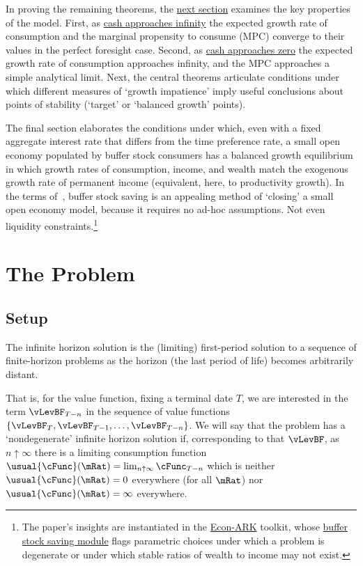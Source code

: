 \documentclass[BufferStockTheory]{subfiles}
\begin{document}
 In proving the remaining theorems, the \hyperlink{AnalysisoftheConvergedConsumptionFunction}{next section} examines the key properties of the model. First, as \hyperlink{LimitsAsmtToInfty}{cash approaches infinity} the expected growth rate of consumption and the marginal propensity to consume (MPC) converge to their values in the perfect foresight case. Second, as \hyperlink{LimitsAsmtToZero}{cash approaches zero} the expected growth rate of consumption approaches infinity, and the MPC approaches a simple analytical limit.  Next, the central theorems articulate conditions under which different measures of `growth impatience' imply useful conclusions about points of stability (`target' or `balanced growth' points).

The final section elaborates the conditions under which, even with a fixed aggregate interest rate that differs from the time preference rate, a small open economy populated by buffer stock consumers has a balanced growth equilibrium in which growth rates of consumption, income, and wealth match the exogenous growth rate of permanent income (equivalent, here, to productivity growth). In the terms of~\cite{schmitt2003closing}, buffer stock saving is an appealing method of `closing' a small open economy model, because it requires no ad-hoc assumptions.  Not even liquidity constraints.\footnote{The paper's insights are instantiated in the \href{https://econ-ark.org}{Econ-ARK} toolkit, whose \href{https://hark.readthedocs.io/en/stable/reference/ConsumptionSaving/ConsIndShockModel.html}{buffer stock saving module} flags parametric choices under which a problem is degenerate or under which stable ratios of wealth to income may not exist.}


\hypertarget{The-Problem}{}

\section{The Problem}

\subsection{Setup}\label{subsec:Setup}

The infinite horizon solution is the (limiting) first-period solution to a sequence of finite-horizon problems as the horizon (the last period of life) becomes arbitrarily distant.

That is, for the value function, fixing a terminal date $T$,  we are interested in the term $\vLevBF_{T-n}$ in the sequence of value functions $\{\vLevBF_{T},\vLevBF_{T-1},\ldots,\vLevBF_{T-n}\}$.  We will say that the problem has a `nondegenerate' infinite horizon solution if, corresponding to that $\vLevBF$, as $n \uparrow \infty$ there is a limiting consumption function $\usual{\cFunc}(\mRat) = \lim_{n \uparrow \infty} \cFunc_{T-n}$ which is neither $\usual{\cFunc}(\mRat)=0$ everywhere (for all $\mRat$) nor $\usual{\cFunc}(\mRat)=\infty$ everywhere.
\end{document}
